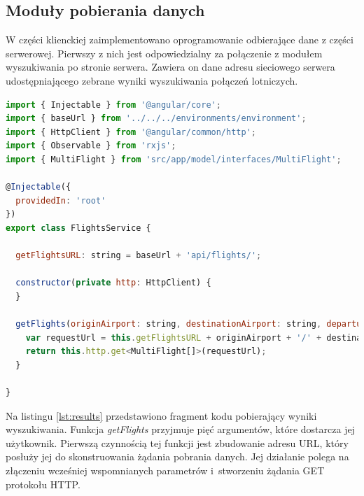 \documentclass[12pt, twoside]{report}
\begin{document}
\subsection{Moduły pobierania danych}
W części klienckiej zaimplementowano oprogramowanie odbierające dane z części serwerowej. Pierwszy z nich jest odpowiedzialny za połączenie z modułem wyszukiwania po stronie serwera. Zawiera on dane adresu sieciowego serwera udostępniającego zebrane wyniki wyszukiwania połączeń lotniczych.
\begin{lstlisting}[language=JavaScript, caption= Kod źródłowy funkcji pobierającej wyniki z serwera, label=lst:results]
import { Injectable } from '@angular/core';
import { baseUrl } from '../../../environments/environment';
import { HttpClient } from '@angular/common/http';
import { Observable } from 'rxjs';
import { MultiFlight } from 'src/app/model/interfaces/MultiFlight';

@Injectable({
  providedIn: 'root'
})
export class FlightsService {

  getFlightsURL: string = baseUrl + 'api/flights/';

  constructor(private http: HttpClient) {
  }

  getFlights(originAirport: string, destinationAirport: string, departureDate: string, typeOfConnection: string, currency: string) : Observable<MultiFlight[]>{
    var requestUrl = this.getFlightsURL + originAirport + '/' + destinationAirport + '/' + departureDate + '/' + typeOfConnection + '/' + currency;
    return this.http.get<MultiFlight[]>(requestUrl);   
  }

}
\end{lstlisting}
Na listingu \ref{lst:results} przedstawiono fragment kodu pobierający wyniki wyszukiwania. Funkcja \textit{getFlights} przyjmuje pięć argumentów, które dostarcza jej użytkownik. Pierwszą czynnością tej funkcji jest zbudowanie adresu URL, który posłuży jej do skonstruowania żądania pobrania danych. Jej działanie polega na złączeniu wcześniej wspomnianych parametrów i~stworzeniu żądania GET protokołu HTTP.
\end{document}
